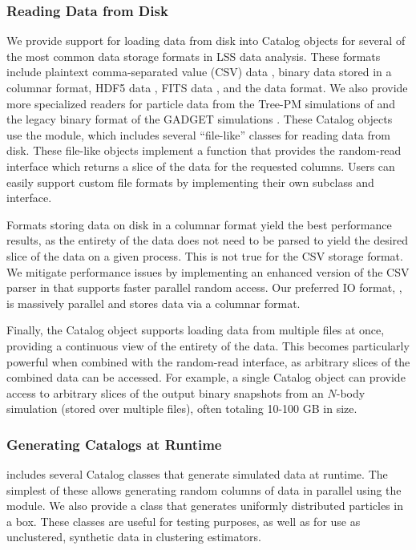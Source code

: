 \subsubsection{Reading Data from Disk}

We provide support for loading data from disk into Catalog objects for
several of the most common data storage formats in LSS data analysis.
These formats include
plaintext comma-separated value (CSV) data
\citep[via \pandas{},][]{McKinney:2010},
binary data stored in a columnar format,
HDF5 data \citep[via \hdfpy{},][]{h5py},
FITS data \citep[via \fitsio{},][]{fitsio},
and the \bigfile{} data format.
We also provide more specialized readers for particle data from
the Tree-PM simulations of \citet{White:2002}
and the legacy binary format of the GADGET simulations \citep{Springel:2005}.
These Catalog objects use the  module, which includes
several ``file-like'' classes for reading data from disk. These
file-like objects implement a  function
that provides the random-read interface which
returns a slice of the data for the requested columns.
Users can easily support custom file formats by implementing their own
subclass and  interface.

Formats storing data on disk in a columnar format yield the best performance
results, as the entirety of the data does not need to be parsed to yield the
desired slice of the data on a given process.
This is not true for the CSV storage format. We mitigate performance
issues by implementing an enhanced version of the CSV
parser in \pandas{} that supports faster parallel random access.
Our preferred IO format, \bigfile{}, is massively parallel and stores
data via a columnar format.

Finally, the Catalog object supports loading data from multiple files at
once, providing a continuous view of the entirety of the data.
This becomes particularly powerful when combined with the random-read interface,
as arbitrary slices of the combined data can be accessed. For example, a single
Catalog object can provide access to arbitrary slices of the output binary
snapshots from an $N$-body simulation (stored over multiple files), often
totaling 10-100 GB in size.

\subsubsection{Generating Catalogs at Runtime}

\nbkit{} includes several Catalog classes that generate simulated
data at runtime. The simplest of these allows
generating random columns of data in parallel using the 
module. We also provide a  class that generates
uniformly distributed particles in a box. These classes are useful for testing
purposes, as well as for use as unclustered, synthetic data in clustering
estimators.

